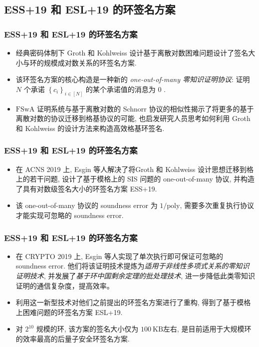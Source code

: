 \documentclass{beamer}
\begin{document}
    
        
    

    \subsection{ESS+19 和 ESL+19 的环签名方案}
    \begin{frame}
        \frametitle{ESS+19 和 ESL+19 的环签名方案}
        \begin{itemize}
            \item 经典密码体制下 Groth 和 Kohlweiss  设计基于离散对数困难问题设计了签名大小与环的规模成对数关系的环签名方案.
            \item 该环签名方案的核心构造是一种新的 \emph{one-out-of-many 零知识证明协议}: 证明 $N$ 个承诺 $\left\{c_{i}\right\}_{i \in[N]}$ 的某个承诺值的消息为 $0$ .
            \item $\mathrm{FSwA}$ 证明系统与基于离散对数的 Schnorr 协议的相似性揭示了将更多的基于离散对数的协议迁移到格基协议的可能, 也启发研究人员思考如何利用 Groth 和 Kohlweiss 的设计方法来构造高效格基环签名. 
        \end{itemize}
    
        
    \end{frame}

    \begin{frame}
        \frametitle{ESS+19 和 ESL+19 的环签名方案}
        \begin{itemize}
            \item 在 ACNS 2019 上, Esgin 等人解决了将Groth 和 Kohlweiss  设计思想迁移到格上的若干问题, 设计了基于模格上的 SIS 问题的 one-out-of-many 协议, 并构造了具有对数级签名大小的环签名方案 ESS+19. 
            \item 该 one-out-of-many 协议的 soundness error 为 $1 /\text{poly}$, 需要多次重复执行协议才能实现可忽略的 soundness error. 
        \end{itemize}
        
    
    \end{frame}

    \begin{frame}
        \frametitle{ESS+19 和 ESL+19 的环签名方案}
    
        \begin{itemize}
            \item 在 CRYPTO 2019 上, Esgin 等人实现了单次执行即可保证可忽略的 soundness error. 他们将该证明技术提炼为\emph{适用于非线性多项式关系的零知识证明技术}, 并发展了\emph{基于环中国剩余定理的批处理技术}, 进一步降低此类零知识证明的通信复杂度，提高效率。
            \item 利用这一新型技术对他们之前提出的环签名方案进行了重构, 得到了基于模格上困难问题的环签名方案 ESL+19. 
            \item 对 $2^{10}$ 规模的环, 该方案的签名大小仅为 $100 \mathrm{~KB}$左右, 是目前适用于大规模环的效率最高的后量子安全环签名方案.
        \end{itemize}
    
    \end{frame}
\end{document}

